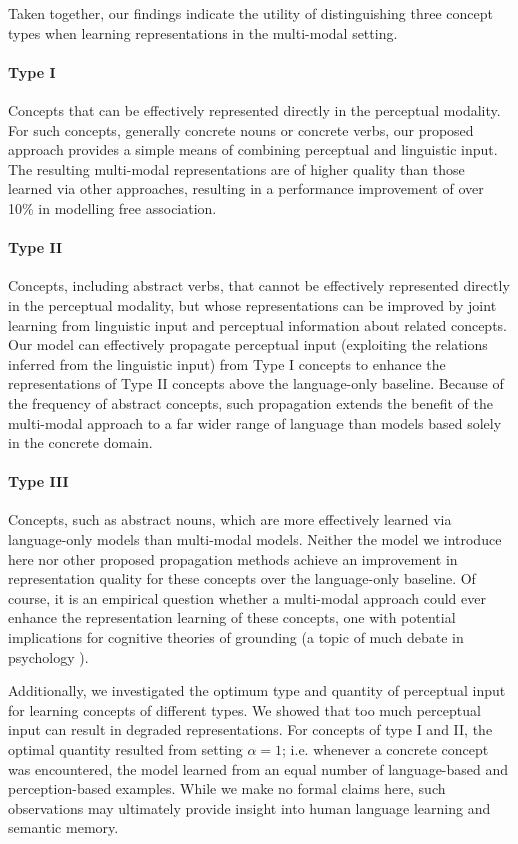 \documentclass[11pt]{article}
\begin{document}
Taken together, our findings indicate the utility of distinguishing three concept types when learning representations in the multi-modal setting. 

\paragraph{Type I}Concepts that can be effectively represented directly in the perceptual modality. For such concepts, generally concrete nouns or concrete verbs, our proposed approach provides a simple means of combining perceptual and linguistic input. The resulting multi-modal representations are of higher quality than those learned via other approaches, resulting in a performance improvement of over 10\% in modelling free association.

\paragraph{Type II}Concepts, including abstract verbs, that cannot be effectively represented directly in the perceptual modality, but whose representations can be improved by joint learning from linguistic input and perceptual information about related concepts. Our model can effectively propagate perceptual input (exploiting the relations inferred from the linguistic input) from Type I concepts to enhance the representations of Type II concepts above the language-only baseline. Because of the frequency of abstract concepts, such propagation extends the benefit of the multi-modal approach to a far wider range of language than models based solely in the concrete domain. 

\paragraph{Type III}Concepts, such as abstract nouns, which are more effectively learned via language-only models than multi-modal models. Neither the model we introduce here nor other proposed propagation methods achieve an improvement in representation quality for these concepts over the language-only baseline. Of course, it is an empirical question whether a multi-modal approach could ever enhance the representation learning of these concepts, one with potential implications for cognitive theories of grounding (a topic of much debate in psychology \cite{grafton2009embodied,barsalou2010grounded}). 

Additionally, we investigated the optimum type and quantity of perceptual input for learning concepts of different types. We showed that too much perceptual input can result in degraded representations. For concepts of type I and II, the optimal quantity resulted from setting \(\alpha = 1\); i.e. whenever a concrete concept was encountered, the model learned from an equal number of language-based and perception-based examples. While we make no formal claims here, such observations may ultimately provide insight into human language learning and semantic memory. 
\end{document}

